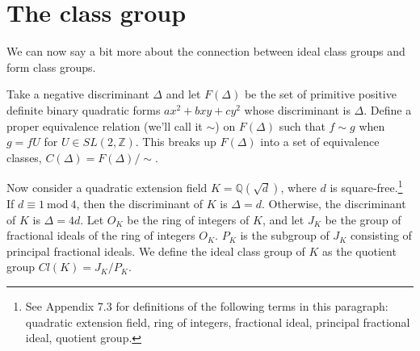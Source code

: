 \documentclass{article}
\theoremstyle{definition}
\theoremstyle{theorem}
\theoremstyle{example}
\theoremstyle{corollary}
\begin{document}
\bigskip








\section{The class group}

\bigskip

We can now say a bit more about the connection between ideal class groups and form class groups.

\bigskip

Take a negative discriminant \(\Delta\) and let \(F ( \Delta)\) be the set of primitive positive definite binary quadratic forms \(ax^{2} + b xy + c y^{2}\) whose discriminant is \(\Delta\). Define a proper equivalence relation (we'll call it \(\sim \)) on \(F (\Delta)\) such that \(f \sim g\) when \(g = fU\) for \(U \in SL(2, \mathbb{Z})\). This breaks up \(F (\Delta)\) into a set of equivalence classes, \(C(\Delta) = F(\Delta) / \sim\).

\bigskip

Now consider a quadratic extension field \(K = \mathbb{Q}(\sqrt{d})\), where \(d\) is square-free.\footnote{See Appendix 7.3 for definitions of the following terms in this paragraph: quadratic extension field, ring of integers, fractional ideal, principal fractional ideal, quotient group.} If \(d \equiv 1 \ \textrm{mod} \ 4\), then the discriminant of \(K\) is \(\Delta = d\). Otherwise, the discriminant of \(K\) is \(\Delta = 4d\). Let \(O_{K}\) be the ring of integers of \(K\), and let \(J_{K}\) be the group of fractional ideals of the ring of integers \(O_{K}\). \(P_{K}\) is the subgroup of \(J_{K}\) consisting of principal fractional ideals. We define the ideal class group of \(K\) as the quotient group \(Cl(K) = J_{K} / P_{K}\). %

\bigskip
\end{document}
